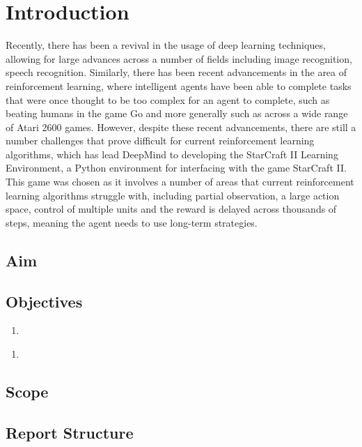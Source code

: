 \chapter{Introduction}%
\label{intro}

Recently, there has been a revival in the usage of deep
learning\cite{lecun2015deep} techniques, allowing for large advances across
a number of fields including image recognition\cite{krizhevsky2012imagenet},
speech recognition\cite{graves2013speech, hinton2012deep}. Similarly,
there has been recent advancements in the area of reinforcement learning,
where intelligent agents have been able to complete tasks that were once thought
to be too complex for an agent to complete, such as beating humans in the game
Go\cite{silver2016mastering} and more generally such as across a wide range of
Atari 2600 games\cite{mnih2015human}. However, despite these recent advancements,
there are still a number challenges that prove difficult for current reinforcement
learning algorithms, which has lead DeepMind\cite{deepmind} to developing the
StarCraft II Learning Environment\cite{pysc2}, a Python environment for interfacing
with the game StarCraft II\cite{vinyals2017starcraft, starcraft2}.
This game was chosen as it involves a number of areas that current reinforcement learning
algorithms struggle with, including partial observation, a large action space, control
of multiple units and the reward is delayed across thousands of steps, meaning the agent
needs to use long-term strategies.


\section{Aim}

\section{Objectives}

\begin{enumerate}
    \item
\end{enumerate}

\begin{enumerate}
    \item
\end{enumerate}

\section{Scope}

\section{Report Structure}
